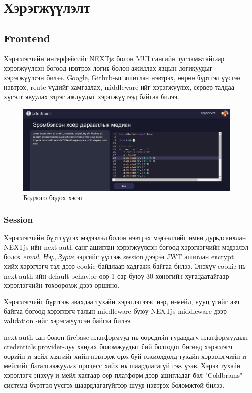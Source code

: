 \chapter{Хэрэгжүүлэлт}
\section{Frontend}
Хэрэглэгчийн интерфейсийг NEXTjs болон MUI сангийн тусламжтайгаар хэрэгжүүлсэн бөгөөд нэвтрэх логик болон ажиллах явцын логикуудыг хэрэгжүүлсэн билээ. Google, Github-ыг ашиглан нэвтрэх, өөрөө бүртгэл үүсгэн нэвтрэх, route-үүдийг хамгаалах, middleware-ийг хэрэгжүүлэх, сервер талдаа хүсэлт явуулах зэрэг ажлуудыг хэрэгжүүлээд байгаа билээ. 

\begin{figure}[h]
  \centering
  \includegraphics[width=16cm]{img/coldbrains-problem.PNG}
  \caption{Бодлого бодох хэсэг}
\end{figure}

\subsection{Session}
Хэрэглэгчийн бүртгүүлэх мэдээлэл болон нэвтрэх мэдээллийг өмнө дурьдсанчлан NEXTjs-ийн next-auth санг ашиглан хэрэгжүүлсэн бөгөөд хэрэглэгчийн мэдээлэл болох \textit{email}, \textit{Нэр}, \textit{Зураг} зэргийг үүсгэж session дээрээ JWT ашиглан encrypt хийх хэрэглэгч тал дээр cookie байдлаар хадгалж байгаа билээ. Энэхүү cookie нь next auth-ийн default behavior-оор 1 сар буюу 30 хоногийн хугацаатайгаар хэрэглэгчийн төхөөрөмж дээр оршино.

Хэрэглэгчийг бүртгэж авахдаа тухайн хэрэглэгчээс нэр, и-мейл, нууц үгийг авч байгаа бөгөөд хэрэглэгч талын middleware буюу NEXTjs middleware\cite{nextMid} дээр 
validation\footnotemark{} -ийг хэрэгжүүлсэн байгаа билээ.

next auth сан болон firebase платформууд нь өөрсдийн гуравдагч платформуудын credentials provider-луу хандах боломжуудыг бий болгодог бөгөөд хэрэглэгч өөрийн и-мейл хаягийг хийн нэвтэрж орж буй тохиолдолд тухайн хэрэглэгчийн и-мейлийг баталгаажуулах процесс хийх нь шаардлагагүй гэж үзэв. Хэрэв тухайн хэрэглэгч энэхүү и-мейл хаягаар өөр платформ дээр ашигладаг бол "Coldbrains" системд бүртгэл үүсгэх шаардлагагүйгээр шууд нэвтрэх боломжтой билээ.

